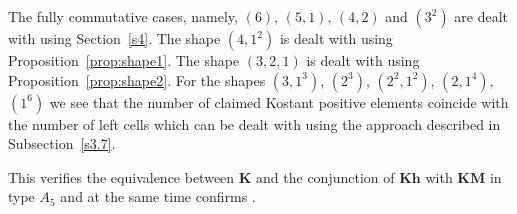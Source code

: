\documentclass[a4paper]{amsart}
\begin{document}
The fully commutative cases, namely, $(6)$, $(5,1)$, $(4,2)$ and 
$(3^2)$ are dealt with using Section~\ref{s4}.
The shape $(4,1^2)$ is dealt with using Proposition~\ref{prop:shape1}.
The shape $(3,2,1)$ is dealt with using Proposition~\ref{prop:shape2}.
For the shapes $(3,1^3)$, $(2^3)$, $(2^2,1^2)$, $(2,1^4)$, $(1^6)$
we see that the number of claimed Kostant positive elements coincide with 
the number of left cells which can be dealt with using
the approach described in Subsection~\ref{s3.7}.

This verifies the equivalence between $\mathbf{K}$ and the conjunction of $\mathbf{Kh}$ with $\mathbf{KM}$ in type $A_5$ and at the same time confirms \cite[Corollary~10.1]{KMM}.
% 
% 
% 
% 
\end{document}

